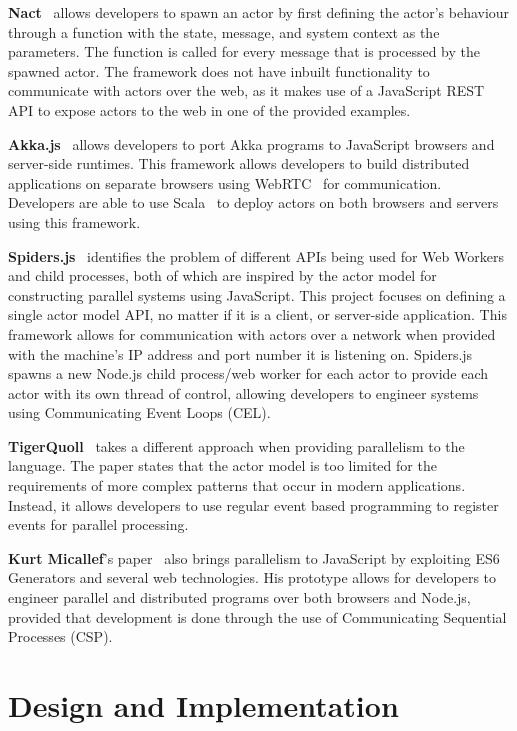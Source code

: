\documentclass[oneside]{um-fict}
\begin{document}
\textbf{Nact}~\cite{nact} allows developers to spawn an actor by first defining the actor's behaviour through a function with the state, message, and system context as the parameters. The function is called for every message that is processed by the spawned actor. The framework does not have inbuilt functionality to communicate with actors over the web, as it makes use of a JavaScript REST API to expose actors to the web in one of the provided examples.

\textbf{Akka.js}~\cite{stivan2015akka} allows developers to port Akka programs to JavaScript browsers and server-side runtimes. This framework allows developers to build distributed applications on separate browsers using WebRTC~\cite{webrtc} for communication. Developers are able to use Scala~\cite{scala} to deploy actors on both browsers and servers using this framework.

\textbf{Spiders.js}~\cite{spidersjs} identifies the problem of different APIs being used for Web Workers and child processes, both of which are inspired by the actor model for constructing parallel systems using JavaScript. This project focuses on defining a single actor model API, no matter if it is a client, or server-side application. This framework allows for communication with actors over a network when provided with the machine's IP address and port number it is listening on. Spiders.js spawns a new Node.js child process/web worker for each actor to provide each actor with its own thread of control, allowing developers to engineer systems using Communicating Event Loops (CEL).

\textbf{TigerQuoll}~\cite{tigerquoll} takes a different approach when providing parallelism to the language. The paper states that the actor model is too limited for the requirements of more complex patterns that occur in modern applications. Instead, it allows developers to use regular event based programming to register events for parallel processing. 

\textbf{Kurt Micallef}'s paper~\cite{kurt} also brings parallelism to JavaScript by exploiting ES6 Generators and several web technologies. His prototype allows for developers to engineer parallel and distributed programs over both browsers and Node.js, provided that development is done through the use of Communicating Sequential Processes (CSP).

\chapter{Design and Implementation}\label{chap:design}
\end{document}

